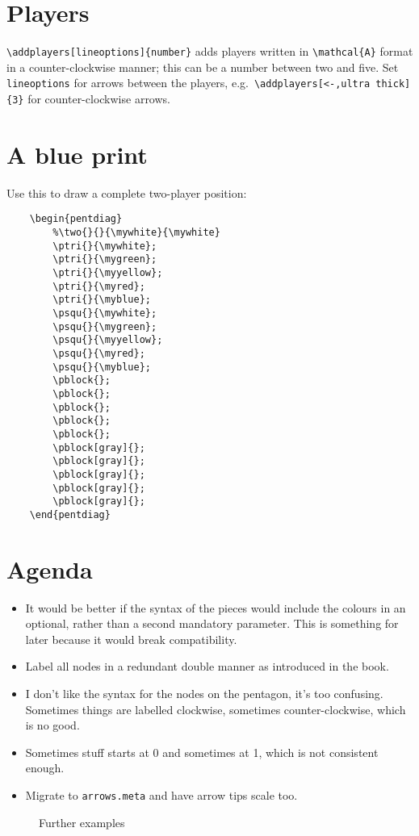 \documentclass[a5paper]{scrartcl}
\begin{document}
\section*{Players}

\verb|\addplayers[lineoptions]{number}| adds players written in \verb|\mathcal{A}| format in a counter-clockwise manner; this can be a number between two and five. Set \verb|lineoptions| for arrows between the players, e.g.~\verb|\addplayers[<-,ultra thick]{3}| for counter-clockwise arrows.

\section*{A blue print}

Use this to draw a complete two-player position:
\begin{verbatim}
    \begin{pentdiag}
        %\two{}{}{\mywhite}{\mywhite}
        \ptri{}{\mywhite};
        \ptri{}{\mygreen};
        \ptri{}{\myyellow};
        \ptri{}{\myred};
        \ptri{}{\myblue};
        \psqu{}{\mywhite};
        \psqu{}{\mygreen};
        \psqu{}{\myyellow};
        \psqu{}{\myred};
        \psqu{}{\myblue};
        \pblock{};
        \pblock{};
        \pblock{};
        \pblock{};
        \pblock{};
        \pblock[gray]{};
        \pblock[gray]{};
        \pblock[gray]{};
        \pblock[gray]{};
        \pblock[gray]{};
    \end{pentdiag}
\end{verbatim}

\section*{Agenda}
\begin{itemize}
    \item It would be better if the syntax of the pieces would include the colours in an optional, rather than a second mandatory parameter. This is something for later because it would break compatibility.
    \item Label all nodes in a redundant double manner as introduced in the book.
    \item I don't like the syntax for the nodes on the pentagon, it's too confusing. Sometimes things are labelled clockwise, sometimes counter-clockwise, which is no good. 
    \item Sometimes stuff starts at 0 and sometimes at 1, which is not consistent enough.
    \item Migrate to \verb|arrows.meta| and have arrow tips scale too.
\end{itemize}

\begin{figure}
    \centering
    
    \caption{Further examples}
    \label{fig:furtherexamples}
\end{figure}
\end{document}
